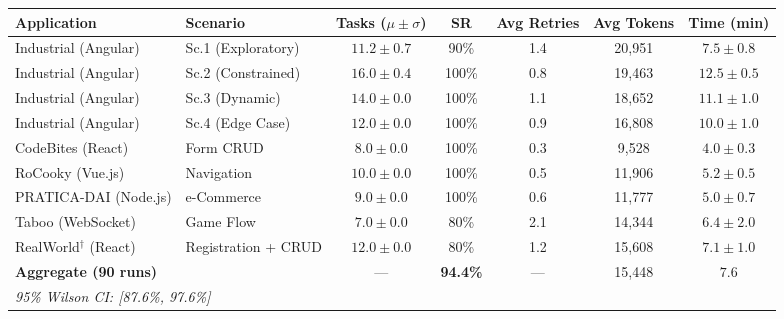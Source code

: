 \begin{tabular}{llccccc}
\toprule
\textbf{Application} & \textbf{Scenario} & \textbf{Tasks ($\mu \pm \sigma$)} & \textbf{SR} & \textbf{Avg Retries} & \textbf{Avg Tokens} & \textbf{Time (min)} \\
\midrule
Industrial (Angular) & Sc.1 (Exploratory) & $11.2 \pm 0.7$ & 90\% & 1.4 & 20,951 & $7.5 \pm 0.8$ \\
Industrial (Angular) & Sc.2 (Constrained) & $16.0 \pm 0.4$ & 100\% & 0.8 & 19,463 & $12.5 \pm 0.5$ \\
Industrial (Angular) & Sc.3 (Dynamic) & $14.0 \pm 0.0$ & 100\% & 1.1 & 18,652 & $11.1 \pm 1.0$ \\
Industrial (Angular) & Sc.4 (Edge Case) & $12.0 \pm 0.0$ & 100\% & 0.9 & 16,808 & $10.0 \pm 1.0$ \\
CodeBites (React) & Form CRUD & $8.0 \pm 0.0$ & 100\% & 0.3 & 9,528 & $4.0 \pm 0.3$ \\
RoCooky (Vue.js) & Navigation & $10.0 \pm 0.0$ & 100\% & 0.5 & 11,906 & $5.2 \pm 0.5$ \\
PRATICA-DAI (Node.js) & e-Commerce & $9.0 \pm 0.0$ & 100\% & 0.6 & 11,777 & $5.0 \pm 0.7$ \\
Taboo (WebSocket) & Game Flow & $7.0 \pm 0.0$ & 80\% & 2.1 & 14,344 & $6.4 \pm 2.0$ \\
RealWorld$^\dagger$ (React) & Registration + CRUD & $12.0 \pm 0.0$ & 80\% & 1.2 & 15,608 & $7.1 \pm 1.0$ \\
\midrule
\multicolumn{2}{l}{\textbf{Aggregate (90 runs)}} & --- & \textbf{94.4\%} & --- & 15,448 & $7.6$ \\
\multicolumn{7}{l}{\textit{95\% Wilson CI: [87.6\%, 97.6\%]}} \\
\bottomrule
\end{tabular}

